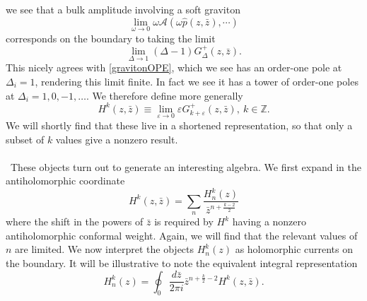 \documentclass[11pt,letterpaper]{article}
\newcommand{\LP}{\left(}
\newcommand{\RP}{\right)}
\newcommand{\mc}[1]{\mathcal{#1}}
\newcommand{\Z}{\mathbb{Z}}
\begin{document}
we see that a bulk amplitude involving a soft graviton \begin{equation}
\lim_{\omega \to 0} \omega \mc{A} \LP \omega \hat{p}(z, \bar{z}),  \cdots \RP
\end{equation}
corresponds on the boundary to taking the limit \begin{equation}
\lim_{\Delta \to 1} (\Delta - 1) G_\Delta^+(z, \bar{z}).
\end{equation}
This nicely agrees with \eqref{gravitonOPE}, which we see has an order-one pole at $\Delta_i = 1$, rendering this limit finite. In fact we see it has a tower of order-one poles at $\Delta_i = 1, 0, -1, \ldots$. We therefore define more generally \begin{equation}
H^k(z, \bar{z}) \equiv \lim_{\varepsilon \to 0} \varepsilon G_{k + \varepsilon}^+(z, \bar{z}), \ k \in \Z.
\end{equation}
We will shortly find that these live in a shortened representation, so that only a subset of $k$ values give a nonzero result.\\
\\
\
These objects turn out to generate an interesting algebra. We first expand in the antiholomorphic coordinate \begin{equation}
H^k(z, \bar{z}) = \sum_n \frac{H_n^k(z)}{\bar{z}^{n + \frac{k-2}{2}}}
\end{equation}
where the shift in the powers of $\bar{z}$ is required by $H^k$ having a nonzero antiholomorphic conformal weight. Again, we will find that the relevant values of $n$ are limited. We now interpret the objects $H_n^k(z)$ as holomorphic currents on the boundary. It will be illustrative to note the equivalent integral representation \begin{equation}
H_n^k(z) = \oint_0 \frac{d \bar{z}}{2 \pi i} \bar{z}^{n + \frac{k}{2} - 2} H^k(z, \bar{z}).
\end{equation}
\end{document}
